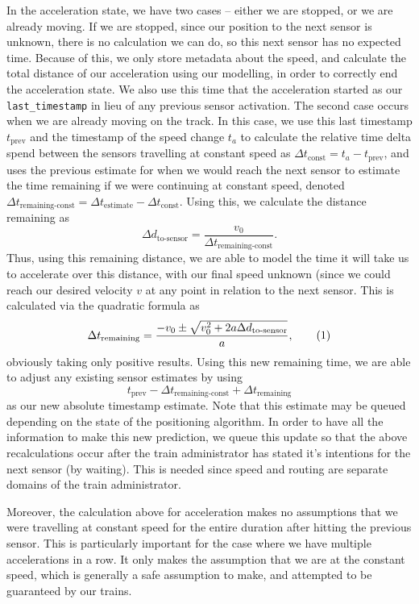\documentclass[12pt, titlepage]{article}
\newcommand{\numeq}{\addtocounter{equation}{1}\tag{\theequation}}
\begin{document}
    In the acceleration state, we have two cases -- either we are stopped, or we are already moving. If we are stopped, since our position to the next sensor is unknown, there is no calculation we can do, so this next sensor has no expected time. Because of this, we only store metadata about the speed, and calculate the total distance of our acceleration using our modelling, in order to correctly end the acceleration state. We also use this time that the acceleration started as our \verb`last_timestamp` in lieu of any previous sensor activation. The second case occurs when we are already moving on the track. In this case, we use this last timestamp $t_\text{prev}$ and the timestamp of the speed change $t_a$ to calculate the relative time delta spend between the sensors travelling at constant speed as $\Delta t_\text{const} = t_a - t_\text{prev}$, and uses the previous estimate for when we would reach the next sensor to estimate the time remaining if we were  continuing at constant speed, denoted $\Delta t_\text{remaining-const} = \Delta t_\text{estimate} - \Delta t_\text{const}$. Using this, we calculate the distance remaining as
    \[
        \Delta d_\text{to-sensor} = \frac{v_0}{\Delta t_\text{remaining-const}}.
    \]
    Thus, using this remaining distance, we are able to model the time it will take us to accelerate over this distance, with our final speed unknown (since we could reach our desired velocity $v$ at any point in relation to the next sensor. This is calculated via the quadratic formula as
    \[
        \Delta t_\text{remaining} = \frac{-v_0 \pm \sqrt{v_0^2 + 2a\Delta d_\text{to-sensor}}}{a}, \numeq\label{eq:estimate_initial_accel}
    \]
    obviously taking only positive results. Using this new remaining time, we are able to adjust any existing sensor estimates by using
    \[
        t_\text{prev} - \Delta t_\text{remaining-const} + \Delta t_\text{remaining}
    \]
    as our new absolute timestamp estimate. Note that this estimate may be queued depending on the state of the positioning algorithm. In order to have all the information to make this new prediction, we queue this update so that the above recalculations occur after the train administrator has stated it's intentions for the next sensor (by waiting). This is needed since speed and routing are separate domains of the train administrator.
    
    Moreover, the calculation above for acceleration makes no assumptions that we were travelling at constant speed for the entire duration after hitting the previous sensor. This is particularly important for the case where we have multiple accelerations in a row. It only makes the assumption that we are at the constant speed, which is generally a safe assumption to make, and attempted to be guaranteed by our trains.
    
\end{document}
